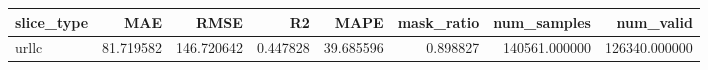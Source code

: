 \begin{tabular}{lrrrrrrr}
\toprule
slice_type & MAE & RMSE & R2 & MAPE & mask_ratio & num_samples & num_valid \\
\midrule
urllc & 81.719582 & 146.720642 & 0.447828 & 39.685596 & 0.898827 & 140561.000000 & 126340.000000 \\
\bottomrule
\end{tabular}
